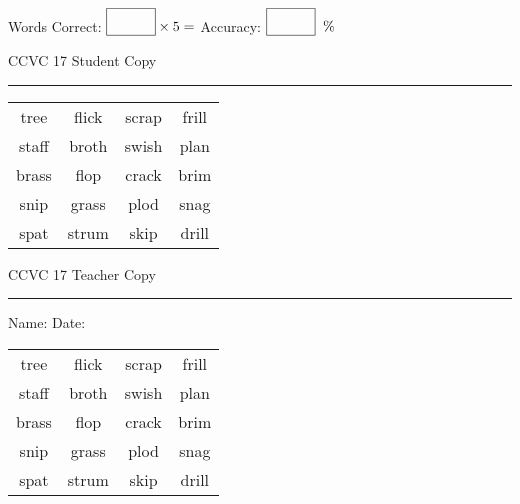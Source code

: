 \documentclass{memoir}
\begin{document}
\normalsize

Words Correct: $\fbox{\phantom{\huge 100}} \times 5 = $ Accuracy: $\fbox{\phantom{\huge 100}}\;\; \%$ 

\vfill

\newpage


\footnotesize \noindent
CCVC 17 \hfill Student Copy
\smallskip
\hrule

\Large

\setlength{\tabcolsep}{14pt}
\def\arraystretch{3}

{\selectfont


\begin{vplace}[0.5]
\begin{center}
\begin{tabular}{cccc}
tree & flick            & scrap & frill \\
staff            & broth    & swish & plan \\
brass       & flop & crack       & brim      \\
snip & grass                    & plod & snag \\
spat            & strum & skip & drill \\
\end{tabular}
\end{center}
\end{vplace}

}

\newpage

\footnotesize \noindent
CCVC 17 \hfill Teacher Copy
\smallskip
\hrule

\normalsize

\vfill

\noindent
Name: \underline{\hspace{1.75in}} \hfill Date: \underline{\hspace{1in}}

\Large

{\selectfont


\begin{vplace}[0.5]
\begin{center}
\begin{tabular}{cccc}
tree & flick            & scrap & frill \\
staff            & broth    & swish & plan \\
brass       & flop & crack       & brim      \\
snip & grass                    & plod & snag \\
spat            & strum & skip & drill \\
\end{tabular}
\end{center}
\end{vplace}



}
\end{document}
